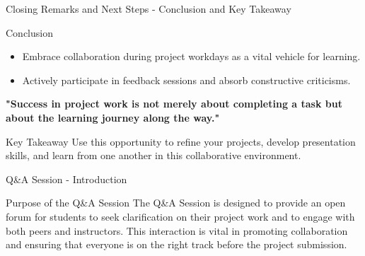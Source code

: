 \documentclass[aspectratio=169]{beamer}
\begin{document}
\begin{frame}[fragile]{Closing Remarks and Next Steps - Conclusion and Key Takeaway}
    \begin{block}{Conclusion}
        \begin{itemize}
            \item Embrace collaboration during project workdays as a vital vehicle for learning.
            \item Actively participate in feedback sessions and absorb constructive criticisms.
        \end{itemize}
        \textbf{"Success in project work is not merely about completing a task but about the learning journey along the way."}
    \end{block}

    \begin{block}{Key Takeaway}
        Use this opportunity to refine your projects, develop presentation skills, and learn from one another in this collaborative environment.
    \end{block}
\end{frame}

\begin{frame}[fragile]{Q\&A Session - Introduction}
    \begin{block}{Purpose of the Q\&A Session}
        The Q\&A Session is designed to provide an open forum for students to seek clarification on their project work and to engage with both peers and instructors. This interaction is vital in promoting collaboration and ensuring that everyone is on the right track before the project submission.
    \end{block}
\end{frame}
\end{document}
